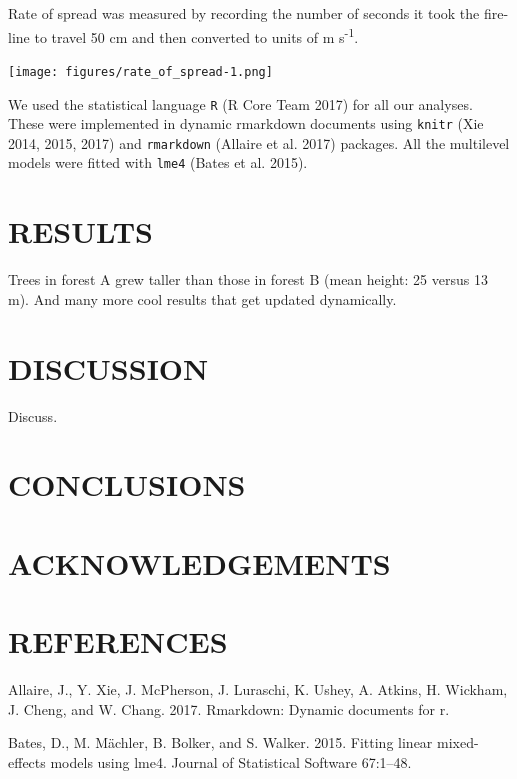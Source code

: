 \documentclass[11pt,a4paper]{article}
\begin{document}
Rate of spread was measured by recording the number of seconds it took
the fire-line to travel 50 cm and then converted to units of m
s\textsuperscript{-1}.

\texttt{[image: figures/rate\_of\_spread-1.png]}

We used the statistical language \texttt{R} (R Core Team 2017) for all
our analyses. These were implemented in dynamic rmarkdown documents
using \texttt{knitr} (Xie 2014, 2015, 2017) and \texttt{rmarkdown}
(Allaire et al. 2017) packages. All the multilevel models were fitted
with \texttt{lme4} (Bates et al. 2015).

\hypertarget{results}{%
\section{RESULTS}\label{results}}

Trees in forest A grew taller than those in forest B (mean height: 25
versus 13 m). And many more cool results that get updated dynamically.

\hypertarget{discussion}{%
\section{DISCUSSION}\label{discussion}}

Discuss.

\hypertarget{conclusions}{%
\section{CONCLUSIONS}\label{conclusions}}

\hypertarget{acknowledgements}{%
\section{ACKNOWLEDGEMENTS}\label{acknowledgements}}

\hypertarget{references}{%
\section{REFERENCES}\label{references}}

\hypertarget{refs}{}
\leavevmode\hypertarget{ref-Allaire_2017}{}%
Allaire, J., Y. Xie, J. McPherson, J. Luraschi, K. Ushey, A. Atkins, H.
Wickham, J. Cheng, and W. Chang. 2017. Rmarkdown: Dynamic documents for
r.

\leavevmode\hypertarget{ref-Bates_2015}{}%
Bates, D., M. Mächler, B. Bolker, and S. Walker. 2015. Fitting linear
mixed-effects models using lme4. Journal of Statistical Software
67:1--48.
\end{document}

